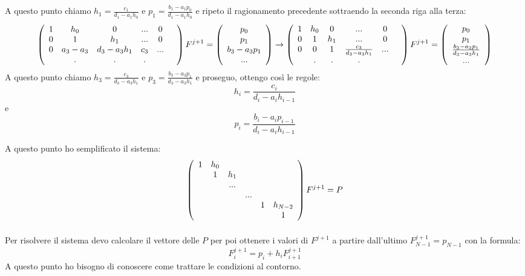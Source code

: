 A questo punto chiamo $h_1 = \frac{c_1}{d_1 -a_1 h_0}$ e $p_1=\frac{b_1-a_1p_0}{d_1 -a_1 h_0}$ e ripeto il ragionamento precedente sottraendo la seconda riga alla terza:
\begin{equation}
\left( \begin{array}{cccccc}
1&h_0&0&...&0\\
0 &1&h_1&...&0\\
0&a_3-a_3&d_3-a_3 h_1&c_3&...\\
&.&.&.&&\\
\end{array} \right) F^{j+1} = \left( \begin{array}{c}
p_0\\p_1\\b_3 -a_3 p_1\\...
\end{array} \right) \to
\left( \begin{array}{cccccc}
1&h_0&0&...&0\\
0 &1&h_1&...&0\\
0&0&1&\frac{c_3}{d_3-a_3 h_1}&...\\
&.&.&.&&\\
\end{array} \right) F^{j+1} = \left( \begin{array}{c}
p_0\\p_1\\\frac{b_3 -a_3 p_1}{d_3-a_3 h_1}\\...
\end{array} \right)
\end{equation}
A questo punto chiamo $h_3 = \frac{c_3}{d_3 -a_3 h_1}$ e $p_3=\frac{b_3-a_3p_1}{d_3 -a_3 h_1}$ e proseguo, ottengo cos\`i le regole:
\begin{equation}\label{eq:hi}
h_i = \frac{c_i}{d_i -a_i h_{i-1}}
\end{equation}
e
\begin{equation}\label{eq:pi}
p_i=\frac{b_i-a_ip_{i-1}}{d_i -a_i h_{i-1}}
\end{equation}

A questo punto ho semplificato il sistema:
\begin{equation}\end{equation}
$$\left( \begin{array}{cccccc}
1&h_0&&&\\
&1&h_1&\\
&&...&&&\\
&&&...&&\\
&&&&1&h_{N-2}\\
&&&&&1
\end{array} \right)F^{j+1} = P$$
\begin{equation}\end{equation}

Per risolvere il sistema devo calcolare il vettore delle $P$ per poi ottenere i valori di $F^{j+1}$ a partire dall'ultimo $F_{N-1}^{j+1} = p_{N-1}$ con la formula:
\begin{equation}
F_{i}^{j+1} = p_{i}+h_i F_{i+1}^{j+1}
\end{equation}
A questo punto ho bisogno di conoscere come trattare le condizioni al contorno.